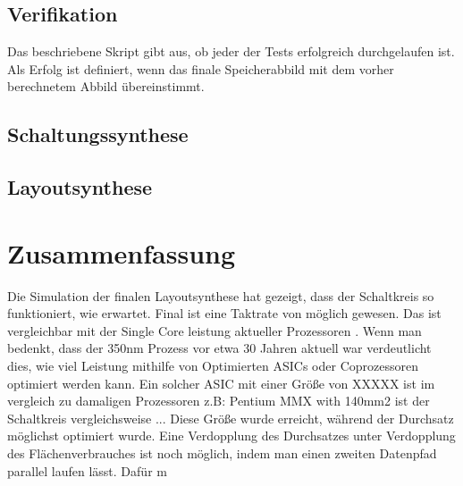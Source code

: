 \documentclass[fontsize=12pt,paper=a4,ngerman]{scrarticle}
\begin{document}
\subsection{Verifikation}
Das beschriebene Skript gibt aus, ob jeder der Tests erfolgreich durchgelaufen
ist. Als Erfolg ist definiert, wenn das finale Speicherabbild mit dem vorher
berechnetem Abbild übereinstimmt.

\subsection{Schaltungssynthese}

\subsection{Layoutsynthese}

\section{Zusammenfassung}
Die Simulation der finalen Layoutsynthese hat gezeigt, dass der Schaltkreis so
funktioniert, wie erwartet. Final ist eine Taktrate von möglich gewesen. Das
ist vergleichbar mit der Single Core leistung aktueller Prozessoren . Wenn man
bedenkt, dass der 350nm Prozess vor etwa 30 Jahren aktuell war verdeutlicht
dies, wie viel Leistung mithilfe von Optimierten ASICs oder Coprozessoren
optimiert werden kann. Ein solcher ASIC mit einer Größe von XXXXX ist im
vergleich zu damaligen Prozessoren z.B: Pentium MMX with 140mm2 ist der
Schaltkreis vergleichsweise ... Diese Größe wurde erreicht, während der
Durchsatz möglichst optimiert wurde. Eine Verdopplung des Durchsatzes unter
Verdopplung des Flächenverbrauches ist noch möglich, indem man einen zweiten
Datenpfad parallel laufen lässt. Dafür m%
\end{document}
